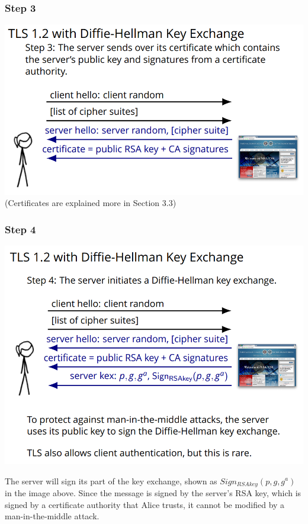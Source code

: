 \documentclass[11pt]{article} %
\begin{document}
\subsubsection{Step 3}

\begin{center}
	\includegraphics[scale=.8]{./DiffieStep3.png}
	\\(Certificates are explained more in Section 3.3)
\end{center}

\subsubsection{Step 4}

\begin{center}
	\includegraphics[scale=.8]{./DiffieStep4.png}
\end{center}

 \noindent The server will sign its part of the key exchange, shown as 
 $Sign_{RSAkey}(p,g,g^a)$ in the image above. Since the message is signed by 
 the server's RSA key, which is signed by a certificate authority that Alice 
 trusts, it cannot be modified by a man-in-the-middle attack.
\end{document}
